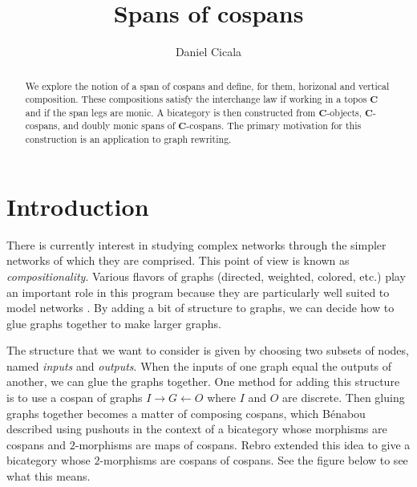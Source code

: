 \documentclass[11pt]{amsart}
\newcommand{\cat}[1]{\mathbf{#1}}
\theoremstyle{remark}
\theoremstyle{definition}
\begin{document}

\begin{abstract}
	We explore the notion of a span of cospans and define, for them, horizonal and vertical composition.  These compositions satisfy the interchange law if working in a topos $\cat{C}$ and if the span legs are monic. A bicategory is then constructed from $\cat{C}$-objects, $\cat{C}$-cospans, and doubly monic spans of $\cat{C}$-cospans. The primary motivation for this construction is an application to graph rewriting.
\end{abstract}

\title{Spans of cospans}
\author{Daniel Cicala}
\maketitle

%
\section{Introduction} %
%

There is currently interest in studying complex networks through the simpler networks of which they are comprised. This point of view is known as \textit{compositionality}. Various flavors of graphs (directed, weighted, colored, etc.) play an important role in this program because they are particularly well suited to model networks \cite{Baez_CompFrameMarkovProcess,Baez_CompFrameLinearNetworks,RoseSabadinWalters_SepAlgNCospansGraphs,RoseSabadinWalters_CalcColimsComp}. By adding a bit of structure to graphs, we can decide how to glue graphs together to make larger graphs.  

The structure that we want to consider is given by choosing two subsets of nodes, named \textit{inputs} and \textit{outputs}. When the inputs of one graph equal the outputs of another, we can glue the graphs together. One method for adding this structure is to use a cospan of graphs $I \to G \leftarrow O$ where $I$ and $O$ are discrete. Then gluing graphs together becomes a matter of composing cospans, which B\'{e}nabou \cite{Benabou_Bicats} described using pushouts in the context of a bicategory whose morphisms are cospans and $2$-morphisms are maps of cospans. Rebro \cite{Rebro_Span2} extended this idea to give a bicategory whose $2$-morphisms are cospans of cospans.  See the figure below to see what this means.    
\end{document}
